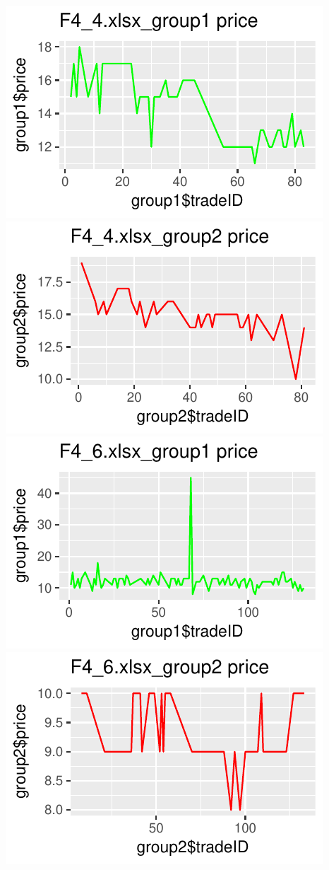 \documentclass[]{article}
\begin{document}
\includegraphics{finance_homework_files/figure-latex/unnamed-chunk-5-5.pdf}
\includegraphics{finance_homework_files/figure-latex/unnamed-chunk-5-6.pdf}
\includegraphics{finance_homework_files/figure-latex/unnamed-chunk-5-7.pdf}
\includegraphics{finance_homework_files/figure-latex/unnamed-chunk-5-8.pdf}
\end{document}
